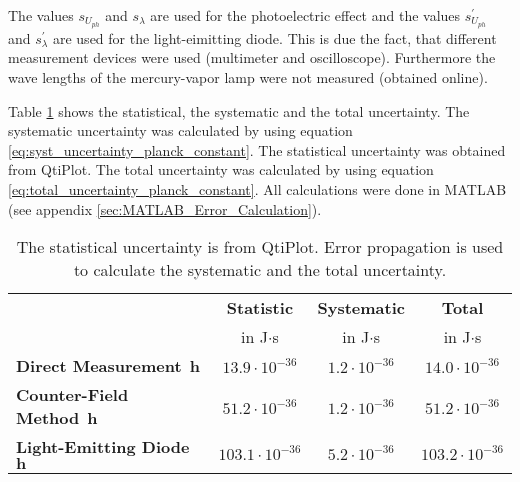 The values $s_{U_{ph}}$ and $s_{\lambda}$ are used for the photoelectric effect and the values $s_{U_{ph}}^\prime$ and $s_{\lambda}^\prime$ are used for the light-eimitting diode. This is due the fact, that different measurement devices were used (multimeter and oscilloscope). Furthermore the wave lengths of the mercury-vapor lamp were not measured (obtained online).

Table \ref{tab:Uncertainty_Planck_Constant} shows the statistical, the systematic and the total uncertainty. The systematic uncertainty was calculated by using equation \ref{eq:syst_uncertainty_planck_constant}. The statistical uncertainty was obtained from QtiPlot. The total uncertainty was calculated by using equation \ref{eq:total_uncertainty_planck_constant}. All calculations were done in MATLAB (see appendix \ref{sec:MATLAB_Error_Calculation}).

\begin{table}[H]
	\centering
	\renewcommand{\arraystretch}{1.2}
	\begin{tabular}{|l|c|c|c|}
		\cline{2-4}
		\multicolumn{1}{c|}{} & \textbf{Statistic} & \textbf{Systematic} & \textbf{Total} \\
		\multicolumn{1}{c|}{} & in J$\cdot$s & in J$\cdot$s & in J$\cdot$s \\
		\hline
		\textbf{Direct Measurement}\ $\boldsymbol{h}$ & $13.9\cdot10^{-36}$ & $1.2\cdot10^{-36}$ & $14.0\cdot10^{-36}$ \\
		\hline
		\textbf{Counter-Field Method}\ $\boldsymbol{h}$ & $51.2\cdot10^{-36}$ & $1.2\cdot10^{-36}$ & $51.2\cdot10^{-36}$ \\
		\hline
		\textbf{Light-Emitting Diode}\ $\boldsymbol{h}$ & $103.1\cdot10^{-36}$ & $5.2\cdot10^{-36}$ & $103.2\cdot10^{-36}$ \\
		\hline
	\end{tabular}
	\caption{The statistical uncertainty is from QtiPlot. Error propagation is used to calculate the systematic and the total uncertainty.}
	\label{tab:Uncertainty_Planck_Constant}
\end{table}
